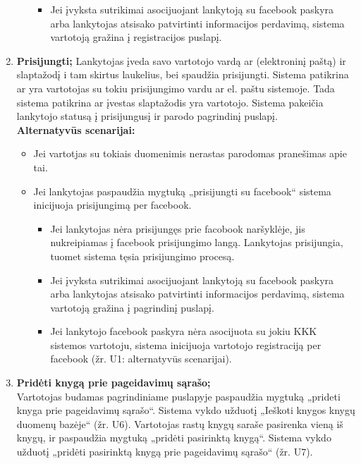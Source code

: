 \documentclass{VUMIFPSkursinis}
\begin{document}
\begin{enumerate}[label=\textbf{U\arabic*.}]
\begin{itemize}
\begin{itemize}
							\item Jei įvyksta sutrikimai asocijuojant lankytoją su facebook paskyra arba lankytojas atsisako patvirtinti informacijos perdavimą,
								sistema vartotoją gražina į registracijos puslapį.
						\end{itemize}
				\end{itemize}
			\item \textbf{Prisijungti;}
				Lankytojas įveda savo vartotojo vardą ar (elektroninį paštą) ir slaptažodį i tam skirtus laukelius, bei spaudžia prisijungti.
				Sistema patikrina ar yra vartotojas su tokiu prisijungimo vardu ar el. paštu sistemoje. 
				Tada sistema patikrina ar įvestas slaptažodis yra vartotojo. Sistema pakeičia lankytojo statusą į prisijungusį ir parodo pagrindinį puslapį.\\
				\textbf{Alternatyvūs scenarijai:}
				\begin{itemize}
					\item Jei vartotjas su tokiais duomenimis nerastas parodomas pranešimas apie tai.
					\item Jei lankytojas paspaudžia mygtuką „prisijungti su facebook“ sistema inicijuoja prisijungimą per facebook.
						\begin{itemize}
							\item Jei lankytojas nėra prisijungęs prie facobook naršyklėje, jis nukreipiamas į facebook prisijungimo langą. 
								Lankytojas prisijungia, tuomet sistema tęsia prisijungimo procesą.
							\item Jei įvyksta sutrikimai asocijuojant lankytoją su facebook paskyra arba lankytojas atsisako patvirtinti informacijos perdavimą,
								sistema vartotoją gražina į pagrindinį puslapį.
							\item Jei lankytojo facebook paskyra nėra asocijuota su jokiu KKK sistemos vartotoju, sistema inicijuoja vartotojo registraciją per facebook (žr. U1: alternatyvūs scenarijai).
						\end{itemize}
				\end{itemize}
			\item \textbf{Pridėti knygą prie pageidavimų sąrašo;} \\
				Vartotojas budamas pagrindiniame puslapyje paspaudžia mygtuką „prideti knyga prie pageidavimų sąrašo“. 
				Sistema vykdo užduotį „Ieškoti knygos knygų duomenų bazėje“ (žr. U6).
				Vartotojas rastų knygų saraše pasirenka vieną iš knygų, ir paspaudžia mygtuką „pridėti pasirinktą knygą“.
				Sistema vykdo užduotį „pridėti pasirinktą knygą prie pageidavimų sąrašo“ (žr. U7).

\end{enumerate}
\end{document}
